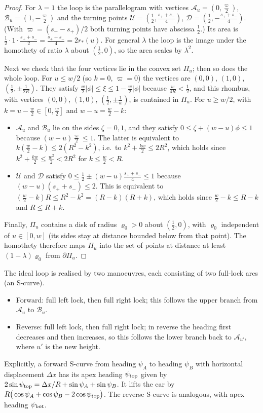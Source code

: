 \begin{proof}
For $\lambda=1$ the loop is the parallelogram with vertices $\mathcal A_u=(0,\frac\varpi2)$, $\mathcal B_u=(1,-\frac\varpi2)$ and the turning points $\mathcal U=(\frac12,\frac{s_++s_-}4)$, $\mathcal D=(\frac12,-\frac{s_++s_-}4)$.
(With $\varpi=(s_--s_+)/2$ both turning points have abscissa $\frac12$.)
Its area is $\frac12\cdot1\cdot\frac{s_++s_-}2=\frac{s_++s_-}4=2r_*(u)$.
For general $\lambda$ the loop is the image under the homothety of ratio $\lambda$ about $(\frac12,0)$, so the area scales by $\lambda^2$.

Next we check that the four vertices lie in the convex set $\Pi_u$; then so does the whole loop.
For $u\le w/2$ (so $k=0$, $\varpi=0$) the vertices are $(0,0)$, $(1,0)$, $(\frac12,\pm\frac1{2R})$.
They satisfy $\frac w2|\phi|\le\xi\le1-\frac w2|\phi|$ because $\frac w{4R}<\frac12$, and this rhombus, with vertices $(0,0)$, $(1,0)$, $(\frac12,\pm\frac1w)$, is contained in $\Pi_u$.
For $u\ge w/2$, with $k=u-\frac w2\in[0,\frac w2]$ and $w-u=\frac w2-k$:
\begin{itemize}[nosep]
\item $\mathcal A_u$ and $\mathcal B_u$ lie on the sides $\zeta=0,1$, and they satisfy $0\le\zeta+(w-u)\phi\le1$ because $(w-u)\frac\varpi2\le1$.
The latter is equivalent to $k(\frac w2-k)\le2(R^2-k^2)$, i.e.\ to $k^2+\frac{kw}2\le2R^2$, which holds since $k^2+\frac{kw}2\le\frac{w^2}2<2R^2$ for $k\le\frac w2<R$.
\item $\mathcal U$ and $\mathcal D$ satisfy $0\le\frac12\pm(w-u)\frac{s_++s_-}4\le1$ because $(w-u)(s_++s_-)\le2$.
This is equivalent to $(\frac w2-k)R\le R^2-k^2=(R-k)(R+k)$, which holds since $\frac w2-k\le R-k$ and $R\le R+k$.
\end{itemize}
Finally, $\Pi_u$ contains a disk of radius $\varrho_0>0$ about $(\frac12,0)$, with $\varrho_0$ independent of $u\in[0,w]$ (its sides stay at distance bounded below from that point).
The homothety therefore maps $\Pi_u$ into the set of points at distance at least $(1-\lambda)\varrho_0$ from $\partial\Pi_u$.
\end{proof}

The ideal loop is realised by two manoeuvres, each consisting of two full-lock arcs (an S-curve).
\begin{itemize}[nosep]
\item Forward: full left lock, then full right lock; this follows the upper branch from $\mathcal A_u$ to $\mathcal B_u$.
\item Reverse: full left lock, then full right lock; in reverse the heading first decreases and then increases, so this follows the lower branch back to $\mathcal A_{u'}$, where $u'$ is the new height.
\end{itemize}
Explicitly, a forward S-curve from heading $\psi_A$ to heading $\psi_B$ with horizontal displacement $\Delta x$ has its apex heading $\psi_{\rm top}$ given by $2\sin\psi_{\rm top}=\Delta x/R+\sin\psi_A+\sin\psi_B$.
It lifts the car by $R\big(\cos\psi_A+\cos\psi_B-2\cos\psi_{\rm top}\big)$.
The reverse S-curve is analogous, with apex heading $\psi_{\rm bot}$.

